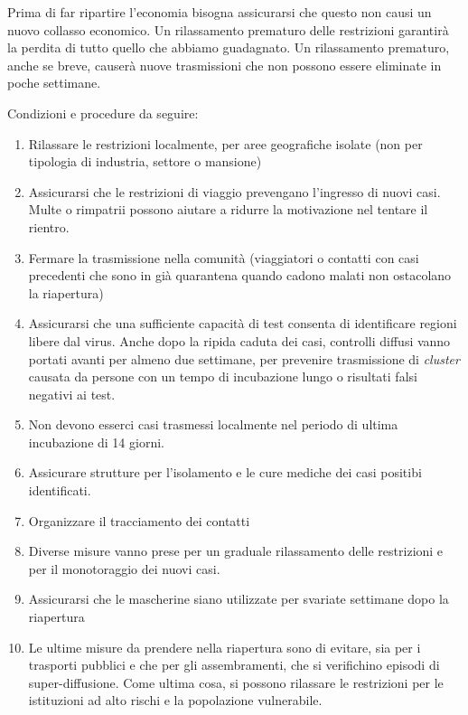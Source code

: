 \documentclass[onecolumn,journal]{IEEEtran}
\begin{document}
\large
\begin{multicols}{2}

Prima di far ripartire l'economia bisogna assicurarsi che questo non causi un nuovo collasso economico. 
Un rilassamento prematuro delle restrizioni garantirà la perdita di tutto quello che abbiamo guadagnato. Un rilassamento prematuro, anche se breve, causerà nuove trasmissioni che non possono essere eliminate in poche settimane.

Condizioni e procedure da seguire:

\begin{enumerate}
  \item Rilassare le restrizioni localmente, per aree geografiche isolate (non per tipologia di industria, settore o mansione)
  \item Assicurarsi che le restrizioni di viaggio prevengano l'ingresso di nuovi casi. Multe o rimpatrii possono aiutare a ridurre la motivazione nel tentare il rientro.
  \item Fermare la trasmissione nella comunità (viaggiatori o contatti con casi precedenti che sono in già quarantena quando cadono malati non ostacolano la riapertura)
  \item Assicurarsi che una sufficiente capacità di test consenta di identificare regioni libere dal virus. Anche dopo la ripida caduta dei casi, controlli diffusi vanno portati avanti per almeno due settimane, per prevenire trasmissione di \textit{cluster} causata da persone con un tempo di incubazione lungo o risultati falsi negativi ai test.
  \item Non devono esserci casi trasmessi localmente nel periodo di ultima incubazione di 14 giorni.
  \item Assicurare strutture per l'isolamento e le cure mediche dei casi positibi identificati.
  \item Organizzare il tracciamento dei contatti
  \item Diverse misure vanno prese per un graduale rilassamento delle restrizioni e per il monotoraggio dei nuovi casi.
  \item Assicurarsi che le mascherine siano utilizzate per svariate settimane dopo la riapertura
  \item Le ultime misure da prendere nella riapertura sono di evitare, sia per i trasporti pubblici e che per gli assembramenti, che si verifichino episodi di super-diffusione. Come ultima cosa, si possono rilassare le restrizioni per le istituzioni ad alto rischi e la popolazione vulnerabile.
\end{enumerate}


\end{multicols}
\end{document}
